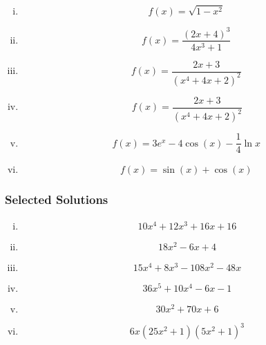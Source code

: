 \documentclass[]{article}
\begin{document}
\begin{multicols}{2}
\begin{enumerate}[(i)]
	\item 		 \[ f(x) = \sqrt{1-x^2} \,\] %
	\item 		 \[ f(x) = \frac{(2x+4)^3}{4x^3+1} \,\] %
	\item 		\[ f(x) = \frac{2x+3}{(x^4+4x+2)^2} \,\] 
	\item \[f(x) = \frac{2x+3}{(x^4+4x+2)^2}\]
	
	\item  \[f(x) = 3e^x-4\cos (x) - \frac{1}{4}\ln x\,\]
	\item \[f(x) = \sin(x)+\cos(x)\,\]
	
\end{enumerate}
\end{multicols}

\subsubsection*{Selected Solutions}
\begin{multicols}{2}
	\begin{enumerate}[(i)]
	\item		 \[ 10x^4+12x^3+16x+16\]
	\item			 \[ 18x^2-6x+4\]
	\item	 \[ 15x^4+8x^3-108x^2-48x\]
	\item		 \[ 36x^5+10x^4-6x-1\]
	\item		 \[ 30x^2+70x+6\]
	\item		 \[ 6x(25x^2+1)(5x^2+1)^3\]
\end{enumerate}
\end{multicols}
		
\newpage		
\end{document}
